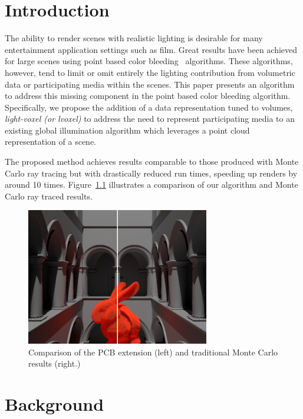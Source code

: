 \documentclass[12pt]{ucthesis}
\begin{document}





\chapter{Introduction}
\label{intro}

The ability to render scenes with realistic lighting is desirable for many entertainment application settings such as film.  Great results have been achieved for large scenes using point based color bleeding~\cite{christensen:2008} algorithms.  These algorithms, however, tend to limit or omit entirely the lighting contribution from volumetric data or participating media within the scenes.  This paper presents an algorithm to address this missing component in the point based color bleeding algorithm.  Specifically, we propose the addition of a data representation tuned to volumes,  \emph{light-voxel (or lvoxel)} to address the need to represent participating media to an existing global illumination algorithm which leverages a point cloud representation of a scene.  

  The proposed method achieves results comparable to those produced with Monte Carlo ray tracing but with drastically reduced run times, speeding up renders by around 10 times.  Figure~\ref{fig:compare} illustrates a comparison of our algorithm and Monte Carlo ray traced results.

\begin{figure}[h!]
    \centering
    \includegraphics[width=80mm]{img/compare.png}
    \caption{Comparison of the PCB extension (left) and traditional Monte Carlo results (right.)}
    \label{fig:compare}
\end{figure}



\chapter{Background}
\label{background}
\end{document}
